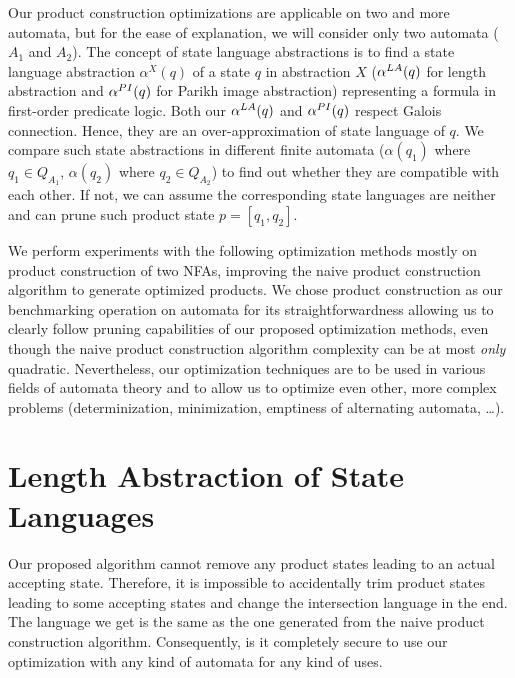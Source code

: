 Our product construction optimizations are applicable on two and more automata, but for the ease of explanation, we will consider only two automata ($A_1$ and $A_2$). The concept of state language abstractions is to find a state language abstraction $\alpha^X(q)$ of a state $q$ in abstraction $X$ ($\alpha^{LA}(q)$ for length abstraction and $\alpha^{PI}(q)$ for Parikh image abstraction) representing a formula in first-order predicate logic. Both our $\alpha^{LA}(q)$ and $\alpha^{PI}(q)$ respect Galois connection. Hence, they are an over-approximation of state language of $q$. We compare such state abstractions in different finite automata ($\alpha(q_1)$ where $q_1 \in Q_{A_1}$, $\alpha(q_2)$ where $q_2 \in Q_{A_2}$) to find out whether they are compatible with each other. If not, we can assume the corresponding state languages are neither and can prune such product state $p = [q_1, q_2]$.

We perform experiments with the following optimization methods mostly on product construction of two NFAs, improving the naive product construction algorithm to generate optimized products. We chose product construction as our benchmarking operation on automata for its straightforwardness allowing us to clearly follow pruning capabilities of our proposed optimization methods, even though the naive product construction algorithm complexity can be at most \emph{only} quadratic. Nevertheless, our optimization techniques are to be used in various fields of automata theory and to allow us to optimize even other, more complex problems (determinization, minimization, emptiness of alternating automata, \ldots).


\section{Length Abstraction of State Languages}

Our proposed algorithm cannot remove any product states leading to an actual accepting state. Therefore, it is impossible to accidentally trim product states leading to some accepting states and change the intersection language in the end. The language we get is the same as the one generated from the naive product construction algorithm. Consequently, is it completely secure to use our optimization with any kind of automata for any kind of uses.

